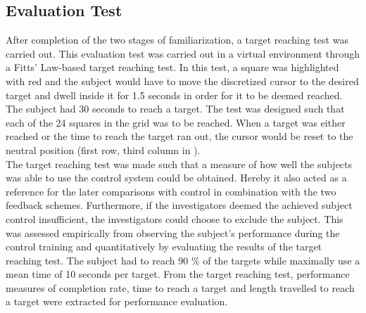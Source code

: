 \subsection{Evaluation Test} \label{sec:meth:contest}

After completion of the two stages of familiarization, a target reaching test was carried out. This evaluation test was carried out in a virtual environment through a Fitts' Law-based target reaching test. In this test, a square was highlighted with red and the subject would have to move the discretized cursor to the desired target and dwell inside it for 1.5 seconds in order for it to be deemed reached. The subject had 30 seconds to reach a target. The test was designed such that each of the 24 squares in the grid was to be reached. When a target was either reached or the time to reach the target ran out, the cursor would be reset to the neutral position (first row, third column in ). \\
The target reaching test was made such that a measure of how well the subjects was able to use the control system could be obtained. Hereby it also acted as a reference for the later comparisons with control in combination with the two feedback schemes. Furthermore, if the investigators deemed the achieved subject control insufficient, the investigators could choose to exclude the subject. This was assessed empirically from observing the subject's performance during the control training and quantitatively by evaluating the results of the target reaching test. The subject had to reach 90 $\percent$ of the targets while maximally use a mean time of 10 seconds per target. From the target reaching test, performance measures of completion rate, time to reach a target and length travelled to reach a target were extracted for performance evaluation.

